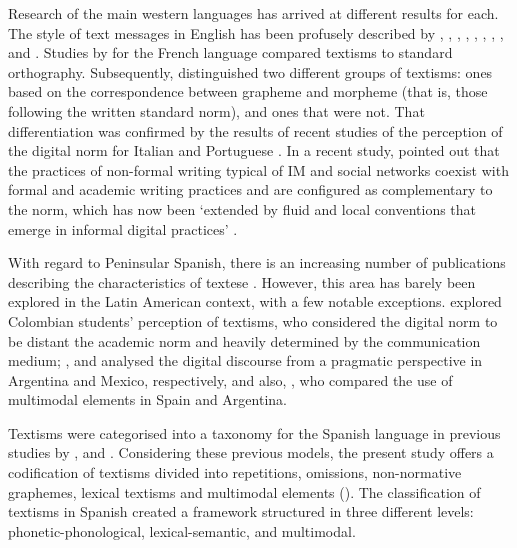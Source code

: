 \documentclass{textolivre}
\begin{document}
Research of the main western languages has arrived at different results for each. The style of text messages in English has been profusely described by \textcite{Thurlow2003}, \textcite{Crystal2008a}, \textcite{Plester2009}, \textcite{Kemp2011}, \textcite{DeJonge2012}, \textcite{Lyddy2014}, \textcite{Wood2014}, \textcite{Waldron2017}, and \textcite{Kemp2017}. Studies by \textcite{Bouillaud2007} for the French language compared textisms to standard orthography. Subsequently, \textcite{Bernicot2014} distinguished two different groups of textisms: ones based on the correspondence between grapheme and morpheme (that is, those following the written standard norm), and ones that were not. That differentiation was confirmed by the results of recent studies of the perception of the digital norm for Italian \cite{Gomez-Camacho2016} and Portuguese \cite{Gomez-Camacho2017}. In a recent study, \textcite{Androutsopoulos2020} pointed out that the practices of non-formal writing typical of IM and social networks coexist with formal and academic writing practices and are configured as complementary to the norm, which has now been ‘extended by fluid and local conventions that emerge in informal digital practices’ \cite[p. 8]{Androutsopoulos2020}.

With regard to Peninsular Spanish, there is an increasing number of publications describing the characteristics of textese \cite{Calero2014, Caurcel2013, DominguezCuesta2005, GalanRodriguez2002, Llisterri2002, ManceraRueda2016, MasAlvarez2012a, VAZQUEZ-CANO2015}. However, this area has barely been explored in the Latin American context, with a few notable exceptions. \textcite{GiraldoGiraldo2018a} explored Colombian students’ perception of textisms, who considered the digital norm to be distant the academic norm and heavily determined by the communication medium; \textcite{Cantamutto2018, Cantamutto2019b}, and \textcite{Flores-Salgado2018} analysed the digital discourse from a pragmatic perspective in Argentina and Mexico, respectively, and also, \textcite{Cantamutto2018b, Cantamutto2019}, who compared the use of multimodal elements in Spain and Argentina. 

Textisms were categorised into a taxonomy for the Spanish language in previous studies by \textcite{Gomez-Camacho2007}, \textcite{Gomez-Camacho2018} and \textcite{Hunt-Gomez2020}. Considering these previous models, the present study offers a codification of textisms divided into repetitions, omissions, non-normative graphemes, lexical textisms and multimodal elements (). The classification of textisms in Spanish created a framework structured in three different levels: phonetic-phonological, lexical-semantic, and multimodal.
\end{document}
